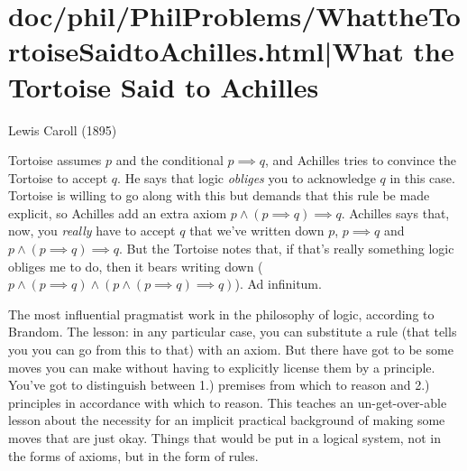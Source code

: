 \documentclass[12pt,a4paper]{report}
\begin{document}
\part{doc/phil/PhilProblems/WhattheTortoiseSaidtoAchilles.html|What the Tortoise Said to Achilles}

Lewis Caroll (1895)

Tortoise assumes $p$ and the conditional $p \implies q$, and Achilles tries to convince the Tortoise to accept $q$. He says that logic \emph{obliges} you to acknowledge $q$ in this case. Tortoise is willing to go along with this but demands that this rule be made explicit, so Achilles add an extra axiom $p \land (p \implies q) \implies q$. Achilles says that, now, you \emph{really} have to accept $q$ that we've written down $p$, $p \implies q$ and $p \land (p \implies q) \implies q$. But the Tortoise notes that, if that's really something logic obliges me to do, then it bears writing down ($p \land (p \implies q) \land (p \land (p \implies q) \implies q)$). Ad infinitum.

The most influential pragmatist work in the philosophy of logic, according to Brandom. The lesson: in any particular case, you can substitute a rule (that tells you you can go from this to that) with an axiom. But there have got to be some moves you can make without having to explicitly license them by a principle.  You've got to distinguish between 1.) premises from which to reason and 2.) principles in accordance with which to reason. This teaches an un-get-over-able lesson about the necessity for an implicit practical background of making some moves that are just okay. Things that would be put in a logical system, not in the forms of axioms, but in the form of rules.
\end{document}
